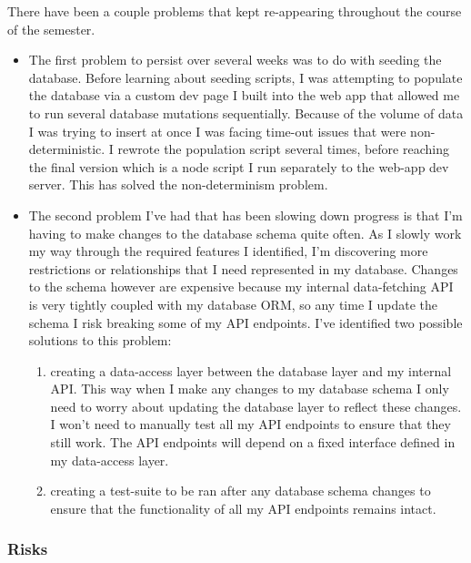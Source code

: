\documentclass[11pt]{article}
\begin{document}
There have been a couple problems that kept re-appearing throughout the course of the semester. 
\begin{itemize}
    \item The first problem to persist over several weeks was to do with seeding the database. Before learning about seeding scripts, I was attempting to populate the database via a custom dev page I built into the web app that allowed me to run several database mutations sequentially. Because of the volume of data I was trying to insert at once I was facing time-out issues that were non-deterministic. I rewrote the population script several times, before reaching the final version which is a node script I run separately to the web-app dev server. This has solved the non-determinism problem. 
    \item The second problem I've had that has been slowing down progress is that I'm having to make changes to the database schema quite often. As I slowly work my way through the required features I identified, I'm discovering more restrictions or relationships that I need represented in my database. Changes to the schema however are expensive because my internal data-fetching API is very tightly coupled with my database ORM, so any time I update the schema I risk breaking some of my API endpoints. I've identified two possible solutions to this problem: 
    \begin{enumerate}
        \item creating a data-access layer between the database layer and my internal API. This way when I make any changes to my database schema I only need to worry about updating the database layer to reflect these changes. I won't need to manually test all my API endpoints to ensure that they still work. The API endpoints will depend on a fixed interface defined in my data-access layer.
        \item creating a test-suite to be ran after any database schema changes to ensure that the functionality of all my API endpoints remains intact.
    \end{enumerate}
\end{itemize}



\subsubsection{Risks}\label{risks}
\end{document}
